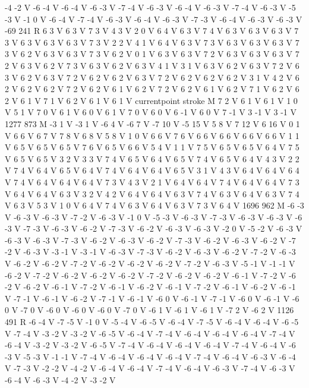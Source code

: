 {-4 -2 V
-6 -4 V
-6 -4 V
-6 -3 V
-7 -4 V
-6 -3 V
-6 -4 V
-6 -3 V
-7 -4 V
-6 -3 V
-5 -3 V
-1 0 V
-6 -4 V
-7 -4 V
-6 -3 V
-6 -4 V
-6 -3 V
-7 -3 V
-6 -4 V
-6 -3 V
-6 -3 V
-69 241 R
6 3 V
6 3 V
7 3 V
4 3 V
2 0 V
6 4 V
6 3 V
7 4 V
6 3 V
6 3 V
6 3 V
7 3 V
6 3 V
6 3 V
6 3 V
7 3 V
2 2 V
4 1 V
6 4 V
6 3 V
7 3 V
6 3 V
6 3 V
6 3 V
7 3 V
6 2 V
6 3 V
6 3 V
7 3 V
6 2 V
0 1 V
6 3 V
6 3 V
7 2 V
6 3 V
6 3 V
6 3 V
7 2 V
6 3 V
6 2 V
7 3 V
6 3 V
6 2 V
6 3 V
4 1 V
3 1 V
6 3 V
6 2 V
6 3 V
7 2 V
6 3 V
6 2 V
6 3 V
7 2 V
6 2 V
6 2 V
6 3 V
7 2 V
6 2 V
6 2 V
6 2 V
3 1 V
4 2 V
6 2 V
6 2 V
6 2 V
7 2 V
6 2 V
6 1 V
6 2 V
7 2 V
6 2 V
6 1 V
6 2 V
7 1 V
6 2 V
6 2 V
6 1 V
7 1 V
6 2 V
6 1 V
6 1 V
currentpoint stroke M
7 2 V
6 1 V
6 1 V
1 0 V
5 1 V
7 0 V
6 1 V
6 0 V
6 1 V
7 0 V
6 0 V
6 -1 V
6 0 V
7 -1 V
3 -1 V
3 -1 V
1277 873 M
-3 1 V
-3 1 V
-6 4 V
-6 7 V
-7 10 V
-5 15 V
5 8 V
7 12 V
6 16 V
0 1 V
6 6 V
6 7 V
7 8 V
6 8 V
5 8 V
1 0 V
6 6 V
7 6 V
6 6 V
6 6 V
6 6 V
6 6 V
1 1 V
6 5 V
6 5 V
6 5 V
7 6 V
6 5 V
6 6 V
5 4 V
1 1 V
7 5 V
6 5 V
6 5 V
6 4 V
7 5 V
6 5 V
6 5 V
3 2 V
3 3 V
7 4 V
6 5 V
6 4 V
6 5 V
7 4 V
6 5 V
6 4 V
4 3 V
2 2 V
7 4 V
6 4 V
6 5 V
6 4 V
7 4 V
6 4 V
6 4 V
6 5 V
3 1 V
4 3 V
6 4 V
6 4 V
6 4 V
7 4 V
6 4 V
6 4 V
6 4 V
7 3 V
4 3 V
2 1 V
6 4 V
6 4 V
7 4 V
6 4 V
6 4 V
7 3 V
6 4 V
6 4 V
6 3 V
3 2 V
4 2 V
6 4 V
6 4 V
6 3 V
7 4 V
6 3 V
6 4 V
6 3 V
7 4 V
6 3 V
5 3 V
1 0 V
6 4 V
7 4 V
6 3 V
6 4 V
6 3 V
7 3 V
6 4 V
1696 962 M
-6 -3 V
-6 -3 V
-6 -3 V
-7 -2 V
-6 -3 V
-1 0 V
-5 -3 V
-6 -3 V
-7 -3 V
-6 -3 V
-6 -3 V
-6 -3 V
-7 -3 V
-6 -3 V
-6 -2 V
-7 -3 V
-6 -2 V
-6 -3 V
-6 -3 V
-2 0 V
-5 -2 V
-6 -3 V
-6 -3 V
-6 -3 V
-7 -3 V
-6 -2 V
-6 -3 V
-6 -2 V
-7 -3 V
-6 -2 V
-6 -3 V
-6 -2 V
-7 -2 V
-6 -3 V
-3 -1 V
-3 -1 V
-6 -3 V
-7 -3 V
-6 -2 V
-6 -3 V
-6 -2 V
-7 -2 V
-6 -3 V
-6 -2 V
-6 -2 V
-7 -2 V
-6 -2 V
-6 -2 V
-6 -2 V
-7 -2 V
-6 -3 V
-5 -1 V
-1 -1 V
-6 -2 V
-7 -2 V
-6 -2 V
-6 -2 V
-6 -2 V
-7 -2 V
-6 -2 V
-6 -2 V
-6 -1 V
-7 -2 V
-6 -2 V
-6 -2 V
-6 -1 V
-7 -2 V
-6 -1 V
-6 -2 V
-6 -1 V
-7 -2 V
-6 -1 V
-6 -2 V
-6 -1 V
-7 -1 V
-6 -1 V
-6 -2 V
-7 -1 V
-6 -1 V
-6 0 V
-6 -1 V
-7 -1 V
-6 0 V
-6 -1 V
-6 0 V
-7 0 V
-6 0 V
-6 0 V
-6 0 V
-7 0 V
-6 1 V
-6 1 V
-6 1 V
-7 2 V
-6 2 V
1126 491 R
-6 -4 V
-7 -5 V
-1 0 V
-5 -4 V
-6 -5 V
-6 -4 V
-7 -5 V
-6 -4 V
-6 -4 V
-6 -5 V
-7 -4 V
-3 -2 V
-3 -2 V
-6 -5 V
-6 -4 V
-7 -4 V
-6 -4 V
-6 -4 V
-6 -4 V
-7 -4 V
-6 -4 V
-3 -2 V
-3 -2 V
-6 -5 V
-7 -4 V
-6 -4 V
-6 -4 V
-6 -4 V
-7 -4 V
-6 -4 V
-6 -3 V
-5 -3 V
-1 -1 V
-7 -4 V
-6 -4 V
-6 -4 V
-6 -4 V
-7 -4 V
-6 -4 V
-6 -3 V
-6 -4 V
-7 -3 V
-2 -2 V
-4 -2 V
-6 -4 V
-6 -4 V
-7 -4 V
-6 -4 V
-6 -3 V
-7 -4 V
-6 -3 V
-6 -4 V
-6 -3 V
-4 -2 V
-3 -2 V
}
